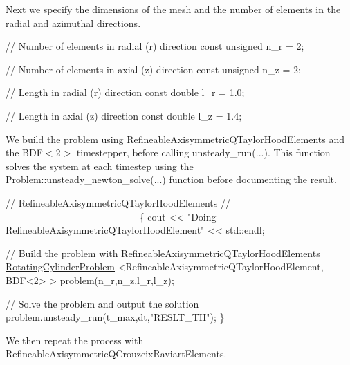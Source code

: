 Next we specify the dimensions of the mesh and the number of elements in the radial and azimuthal directions.


\begin{DoxyCodeInclude}
 \textcolor{comment}{// Number of elements in radial (r) direction}
 \textcolor{keyword}{const} \textcolor{keywordtype}{unsigned} n\_r = 2;

 \textcolor{comment}{// Number of elements in axial (z) direction}
 \textcolor{keyword}{const} \textcolor{keywordtype}{unsigned} n\_z = 2;

 \textcolor{comment}{// Length in radial (r) direction}
 \textcolor{keyword}{const} \textcolor{keywordtype}{double} l\_r = 1.0;

 \textcolor{comment}{// Length in axial (z) direction}
 \textcolor{keyword}{const} \textcolor{keywordtype}{double} l\_z = 1.4;

\end{DoxyCodeInclude}


We build the problem using {\ttfamily Refineable\+Axisymmetric\+Q\+Taylor\+Hood\+Elements} and the {\ttfamily B\+D\+F$<$2$>$} timestepper, before calling {\ttfamily unsteady\+\_\+run}(...). This function solves the system at each timestep using the {\ttfamily Problem\+::unsteady\+\_\+newton\+\_\+solve}(...) function before documenting the result.


\begin{DoxyCodeInclude}
 \textcolor{comment}{// RefineableAxisymmetricQTaylorHoodElements}
 \textcolor{comment}{// -----------------------------------------}
 \{
  cout << \textcolor{stringliteral}{"Doing RefineableAxisymmetricQTaylorHoodElement"} << std::endl;

  \textcolor{comment}{// Build the problem with RefineableAxisymmetricQTaylorHoodElements}
  \hyperlink{classRotatingCylinderProblem}{RotatingCylinderProblem}
   <RefineableAxisymmetricQTaylorHoodElement, BDF<2> > 
   problem(n\_r,n\_z,l\_r,l\_z);
  
  \textcolor{comment}{// Solve the problem and output the solution}
  problem.unsteady\_run(t\_max,dt,\textcolor{stringliteral}{"RESLT\_TH"});
 \}

\end{DoxyCodeInclude}


We then repeat the process with {\ttfamily Refineable\+Axisymmetric\+Q\+Crouzeix\+Raviart\+Elements}.



